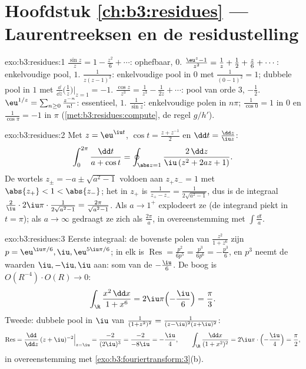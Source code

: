 \section*{Hoofdstuk \ref{ch:b3:residues} --- Laurentreeksen en de
residustelling}

\begin{solution}{exo:b3:residues:1}
$\frac{\sin z}z = 1 - \frac{z^2}6 + \cdots$: ophefbaar, 
$0$. $\frac{\eu^z - 1}{z^2} = \frac1z + \frac12 + \frac z6 +
\cdots$: enkelvoudige pool,  $1$. $\frac1{z(z-1)^2}$:
enkelvoudige pool in $0$ met  $\frac1{(0-1)^2} = 1$;
dubbele pool in $1$ met 
$\frac{\dd}{\dd z}\bigl(\frac1z\bigr)\big|_{z=1} = -1$.
$\frac{\cos z}{z^3} = \frac1{z^3} - \frac1{2z} + \cdots$: pool
van orde $3$,  $-\frac12$. $\eu^{1/z} = \sum_{n\geq0}
\frac{z^{-n}}{n!}$: essentieel,  $1$. $\frac1{\sin z}$:
enkelvoudige polen in $n\pi$;  $\frac1{\cos 0} = 1$ in $0$
en $\frac1{\cos\pi} = -1$ in $\pi$
(\cref{met:b3:residues:compute}, de regel $g/h'$).
\end{solution}

\begin{solution}{exo:b3:residues:2}
Met $z = \eu^{\iu t}$, $\cos t = \frac{z + z^{-1}}2$ en $\dd t =
\frac{\dd z}{\iu z}$:
\[
\int_0^{2\pi}\frac{\dd t}{a + \cos t}
= \oint_{\abs z = 1}\frac{2\,\dd z}{\iu\,(z^2 + 2az + 1)} .
\]
De wortels $z_\pm = -a \pm \sqrt{a^2 - 1}$ voldoen aan $z_+z_- =
1$ met $\abs{z_+} < 1 < \abs{z_-}$; het  in $z_+$ is
$\frac{1}{z_+ - z_-} = \frac1{2\sqrt{a^2-1}}$, dus is de
integraal $\frac2\iu\cdot2\iu\pi\cdot\frac1{2\sqrt{a^2-1}} =
\frac{2\pi}{\sqrt{a^2-1}}$. Als $a \to 1^+$ explodeert ze (de
integrand piekt in $t = \pi$); als $a \to \infty$ gedraagt ze
zich als $\frac{2\pi}a$, in overeenstemming met $\int\frac{\dd
t}a$.
\end{solution}

\begin{solution}{exo:b3:residues:3}
Eerste integraal: de bovenste polen van $\frac{z^2}{1+z^6}$ zijn
$p = \eu^{\iu\pi/6}, \iu, \eu^{5\iu\pi/6}$; in elk is
$\operatorname{Res} = \frac{p^2}{6p^5} = \frac{p^3}{6p^6} =
-\frac{p^3}6$, en $p^3$ neemt de waarden $\iu, -\iu, \iu$ aan:
som van de  $-\frac{\iu}{6}$. De boog is
$O(R^{-4})\cdot O(R) \to 0$:
\[
\int_\R\frac{x^2\,\dd x}{1 + x^6} =
2\iu\pi\Bigl(-\frac \iu6\Bigr) = \frac\pi3 .
\]
Tweede: dubbele pool in $\iu$ van $\frac1{(1+z^2)^2} =
\frac1{(z-\iu)^2(z+\iu)^2}$:
\[
\operatorname{Res} = \frac{\dd}{\dd z}\,(z +
\iu)^{-2}\Big|_{z=\iu} = \frac{-2}{(2\iu)^3} =
\frac{-2}{-8\iu} = -\frac\iu4,
\qquad
\int_\R\frac{\dd x}{(1+x^2)^2} =
2\iu\pi\cdot\Bigl(-\frac\iu4\Bigr) = \frac\pi2 ,
\]
in overeenstemming met \cref{exo:b3:fouriertransform:3}(b).
\end{solution}

